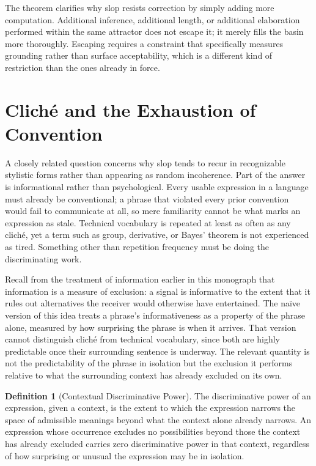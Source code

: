 \documentclass[11pt,oneside]{book}
\theoremstyle{plain}
\theoremstyle{definition}
\newtheorem{definition}[theorem]{Definition}
\theoremstyle{remark}
\begin{document}
The theorem clarifies why slop resists correction by simply adding more computation. Additional inference, additional length, or additional elaboration performed within the same attractor does not escape it; it merely fills the basin more thoroughly. Escaping requires a constraint that specifically measures grounding rather than surface acceptability, which is a different kind of restriction than the ones already in force.

\section{Cliché and the Exhaustion of Convention}

A closely related question concerns why slop tends to recur in recognizable stylistic forms rather than appearing as random incoherence. Part of the answer is informational rather than psychological. Every usable expression in a language must already be conventional; a phrase that violated every prior convention would fail to communicate at all, so mere familiarity cannot be what marks an expression as stale. Technical vocabulary is repeated at least as often as any cliché, yet a term such as group, derivative, or Bayes' theorem is not experienced as tired. Something other than repetition frequency must be doing the discriminating work.

Recall from the treatment of information earlier in this monograph that information is a measure of exclusion: a signal is informative to the extent that it rules out alternatives the receiver would otherwise have entertained. The na\"ive version of this idea treats a phrase's informativeness as a property of the phrase alone, measured by how surprising the phrase is when it arrives. That version cannot distinguish cliché from technical vocabulary, since both are highly predictable once their surrounding sentence is underway. The relevant quantity is not the predictability of the phrase in isolation but the exclusion it performs relative to what the surrounding context has already excluded on its own.

\begin{definition}[Contextual Discriminative Power]
The discriminative power of an expression, given a context, is the extent to which the expression narrows the space of admissible meanings beyond what the context alone already narrows. An expression whose occurrence excludes no possibilities beyond those the context has already excluded carries zero discriminative power in that context, regardless of how surprising or unusual the expression may be in isolation.
\end{definition}
\end{document}
